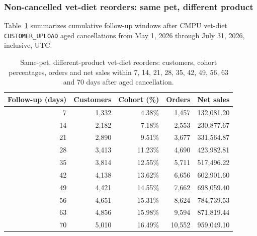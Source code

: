 \clearpage
\subsubsection{Non-cancelled vet-diet reorders: same pet, different product}
Table~\ref{tab:financial-opportunity-reorder-same-pet-different-part} summarizes cumulative
follow-up windows after CMPU vet-diet \texttt{CUSTOMER\_UPLOAD} aged cancellations
from May 1, 2026 through July 31, 2026, inclusive, UTC.

\begin{table}[!htbp]
\centering
\caption{Same-pet, different-product vet-diet reorders: customers, cohort percentages, orders and net sales within 7, 14, 21, 28, 35, 42, 49, 56, 63 and 70 days after aged cancellation.}
\label{tab:financial-opportunity-reorder-same-pet-different-part}
\begin{tabular}{@{}rrrrr@{}}
\toprule
Follow-up (days) & Customers & Cohort (\%) & Orders & Net sales \\
\midrule
7 & 1,332 & 4.38\% & 1,457 & 132,081.20 \\
14 & 2,182 & 7.18\% & 2,553 & 230,877.67 \\
21 & 2,890 & 9.51\% & 3,677 & 331,564.87 \\
28 & 3,413 & 11.23\% & 4,690 & 423,982.81 \\
35 & 3,814 & 12.55\% & 5,711 & 517,496.22 \\
42 & 4,138 & 13.62\% & 6,656 & 602,901.60 \\
49 & 4,421 & 14.55\% & 7,662 & 698,059.40 \\
56 & 4,651 & 15.31\% & 8,624 & 784,739.53 \\
63 & 4,856 & 15.98\% & 9,594 & 871,819.44 \\
70 & 5,010 & 16.49\% & 10,552 & 959,049.10 \\
\bottomrule
\end{tabular}


\end{table}
